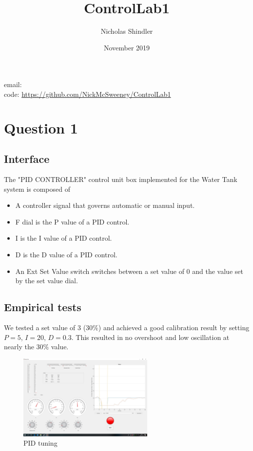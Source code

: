 \documentclass{article}
\title{ControlLab1}
\author{Nicholas Shindler}
\date{November 2019}
\begin{document}
\maketitle

\begin{center}
    email: \\
    code: \url{https://github.com/NickMcSweeney/ControlLab1}
\end{center}

\section{Question 1}
\subsection{Interface}
The "PID CONTROLLER" control unit box implemented for the Water Tank system is composed of 

\begin{itemize}
    \item A controller signal that governs automatic or manual input.
    \item F dial is the P value of a PID control.
    \item I is the I value of a PID control.
    \item D is the D value of a PID control.
    \item An Ext Set Value switch switches between a set value of 0 and the value set by the set value dial.
\end{itemize}




\subsection{Empirical tests}
We tested a set value of 3 (30\%) and achieved a good calibration result by setting $P=5$, $I=20$, $D=0.3$. This resulted in no overshoot and low oscillation at nearly the 30\% value.

\begin{figure}[H]
    \centering
    \includegraphics[width=0.6\textwidth]{PID_tune}
    \caption{PID tuning}
    \label{fig:PID_tune}
\end{figure}
\end{document}
